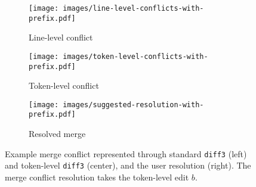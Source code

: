 \newcommand{\rulesep}{\unskip\ \vrule\ }


\begin{figure*}[t]
    \centering
    \begin{subfigure}[t]{0.3\textwidth}
        \texttt{[image: images/line-level-conflicts-with-prefix.pdf]}
        \caption{Line-level conflict}
        \label{fig:line-level-conflict-b}
    \end{subfigure}
    \begin{subfigure}[t]{0.3\textwidth}
        \texttt{[image: images/token-level-conflicts-with-prefix.pdf]}
        \caption{Token-level conflict}
        \label{fig:token-level-conflict-b}
    \end{subfigure}
    \begin{subfigure}[t]{0.3\textwidth}
        \texttt{[image: images/suggested-resolution-with-prefix.pdf]}
        \caption{Resolved merge}
        \label{fig:suggested-merge-res-a}
    \end{subfigure}
    \caption{Example merge conflict represented through standard \texttt{diff3} (left) and token-level \texttt{diff3} (center), and the user resolution (right). The merge conflict resolution takes the token-level edit $b$.}
    \label{fig:word1}
\end{figure*}

